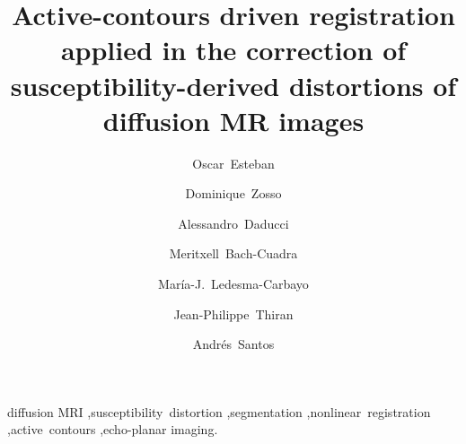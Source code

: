 \documentclass[5p,authoryear]{elsarticle}
\begin{document}
\begin{frontmatter}


\title{Active-contours driven registration applied in the correction of
susceptibility-derived distortions of diffusion MR images}

\author[bit]{Oscar~Esteban}
\author[ucla]{Dominique~Zosso}
\author[scil,lts5]{Alessandro~Daducci}
\author[chuv,lts5]{Meritxell~Bach-Cuadra}
\author[bit]{Mar\'ia-J.~Ledesma-Carbayo}
\author[lts5]{Jean-Philippe~Thiran}
\author[bit]{Andr\'es~Santos}


\address[bit]{Biomedical Image Technologies (BIT), ETSI Telecomunicaci\'on, %
Universidad Polit\'ecnica de Madrid and CIBER-BBN, Madrid, Spain}
\address[ucla]{Department of Mathematics, University of California,
Los Angeles (UCLA), Los Angeles, CA, US}
\address[scil]{Computer Science Department, Faculty of Science, Universit\'e de Sherbrooke, 2500 Boulevard Universit\'e, Sherbrooke, QC J1K 2R1, Canada}
\address[lts5]{Signal Processing Laboratory (LTS5), \'Ecole Polytechnique
F\'ed\'erale de Lausanne (EPFL), Lausanne, Switzerland}
\address[chuv]{Dept. of Radiology, University
Hospital Center (CHUV) and University of Lausanne (UNIL), Lausanne, Switzerland}

\begin{abstract}

\end{abstract}

\begin{keyword}
diffusion MRI \sep susceptibility~distortion \sep segmentation %
\sep nonlinear~registration \sep active~contours \sep echo-planar imaging.
\end{keyword}

\end{frontmatter}

\linenumbers










%



\appendix
{}

\end{document}
